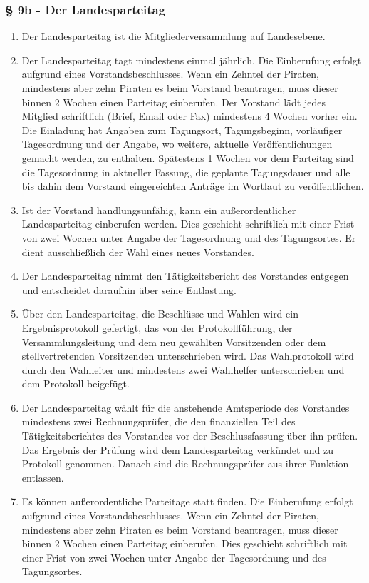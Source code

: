 \documentclass[draft,a4paper,10pt]{article}
\begin{document}
\subsubsection{§ 9b - Der Landesparteitag}
\begin{enumerate}
\item Der Landesparteitag ist die Mitgliederversammlung auf Landesebene.

\item Der Landesparteitag tagt mindestens einmal jährlich. Die Einberufung
erfolgt aufgrund eines Vorstandsbeschlusses. Wenn ein Zehntel der Piraten,
mindestens aber zehn Piraten es beim Vorstand beantragen, muss dieser binnen 2
Wochen einen Parteitag einberufen. Der Vorstand lädt jedes Mitglied schriftlich
(Brief, Email oder Fax) mindestens 4 Wochen vorher ein. Die Einladung hat
Angaben zum Tagungsort, Tagungsbeginn, vorläufiger Tagesordnung und der Angabe,
wo weitere, aktuelle Veröffentlichungen gemacht werden, zu enthalten. Spätestens
1 Wochen vor dem Parteitag sind die Tagesordnung in aktueller Fassung, die
geplante Tagungsdauer und alle bis dahin dem Vorstand eingereichten Anträge im
Wortlaut zu veröffentlichen.

\item Ist der Vorstand handlungsunfähig, kann ein außerordentlicher
Landesparteitag einberufen werden. Dies geschieht schriftlich mit einer Frist
von zwei Wochen unter Angabe der Tagesordnung und des Tagungsortes. Er dient
ausschließlich der Wahl eines neues Vorstandes.

\item Der Landesparteitag nimmt den Tätigkeitsbericht des Vorstandes entgegen
und entscheidet daraufhin über seine Entlastung.

\item Über den Landesparteitag, die Beschlüsse und Wahlen wird ein
Ergebnisprotokoll gefertigt, das von der Protokollführung, der
Versammlungsleitung und dem neu gewählten Vorsitzenden oder dem
stellvertretenden Vorsitzenden unterschrieben wird. Das Wahlprotokoll wird durch
den Wahlleiter und mindestens zwei Wahlhelfer unterschrieben und dem Protokoll
beigefügt.

\item Der Landesparteitag wählt für die anstehende Amtsperiode des Vorstandes
mindestens zwei Rechnungsprüfer, die den finanziellen Teil des
Tätigkeitsberichtes des Vorstandes vor der Beschlussfassung über ihn prüfen. Das
Ergebnis der Prüfung wird dem Landesparteitag verkündet und zu Protokoll
genommen. Danach sind die Rechnungsprüfer aus ihrer Funktion entlassen.

\item Es können außerordentliche Parteitage statt finden. Die Einberufung
erfolgt aufgrund eines Vorstandsbeschlusses. Wenn ein Zehntel der Piraten,
mindestens aber zehn Piraten es beim Vorstand beantragen, muss dieser binnen 2
Wochen einen Parteitag einberufen. Dies geschieht schriftlich mit einer Frist
von zwei Wochen unter Angabe der Tagesordnung und des Tagungsortes.
\end{enumerate}
\end{document}
